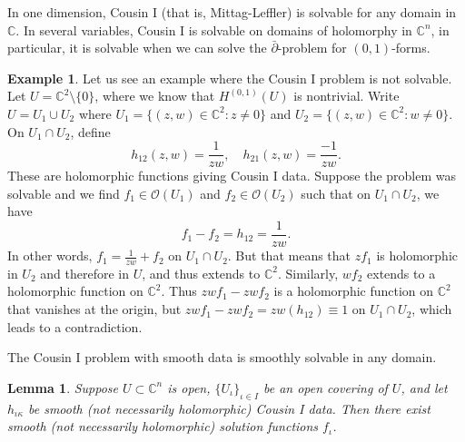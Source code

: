 \documentclass[12pt,openany]{book}
\newcommand{\C}{{\mathbb{C}}}
\newcommand{\sO}{{\mathscr{O}}}
\theoremstyle{plain}
\newtheorem{lemma}[thm]{Lemma}
\theoremstyle{remark}
\theoremstyle{definition}
\theoremstyle{exercise}
\theoremstyle{example}
\newtheorem{example}[thm]{Example}
\begin{document}
In one dimension, Cousin I (that is, Mittag-Leffler) is solvable for
any domain in $\C$.
In several variables, Cousin I is solvable on domains of holomorphy in
$\C^n$, in particular, it is solvable when we can solve the
$\bar{\partial}$-problem for $(0,1)$-forms.

\begin{example}
Let us see an example where the Cousin I problem is not solvable.  Let $U =
\C^2 \setminus \{ 0 \}$, where we know that $H^{(0,1)}(U)$ is nontrivial.
Write $U = U_1 \cup U_2$ where
$U_1 = \{ (z,w) \in \C^2 : z \not= 0 \}$ and
$U_2 = \{ (z,w) \in \C^2 : w \not= 0 \}$.  On $U_1 \cap U_2$, define
\begin{equation*}
h_{12}(z,w) = \frac{1}{zw} , \quad
h_{21}(z,w) = \frac{-1}{zw} .
\end{equation*}
These are holomorphic functions giving Cousin I data.
Suppose the problem was solvable and we find
$f_1 \in \sO(U_1)$ and
$f_2 \in \sO(U_2)$ such that on $U_1 \cap U_2$, we have
\begin{equation*}
f_1 -f_2 = h_{12} = \frac{1}{zw} .
\end{equation*}
In other words, $f_1 = \frac{1}{zw}+f_2$ on $U_1 \cap U_2$.
But that means that $zf_1$ is holomorphic in $U_2$ and
therefore in $U$, and thus extends to $\C^2$.  Similarly, $wf_2$ extends to a
holomorphic function on $\C^2$.  Thus
$zwf_1 -zwf_2$ is a holomorphic function on $\C^2$ that vanishes at the
origin, but $zwf_1 -zwf_2 = zw(h_{12}) \equiv 1$ on $U_1 \cap U_2$,
which leads to a contradiction.
\end{example}

The Cousin I problem with smooth data is smoothly solvable in any domain.

\begin{lemma}
Suppose $U \subset \C^n$ is open,
$\{ U_{\iota} \}_{\iota \in I}$ be an open covering of $U$,
and let $h_{\iota\kappa}$ be smooth (not necessarily holomorphic) Cousin I
data.  Then there exist smooth (not necessarily holomorphic) solution
functions $f_\iota$.
\end{lemma}
\end{document}
